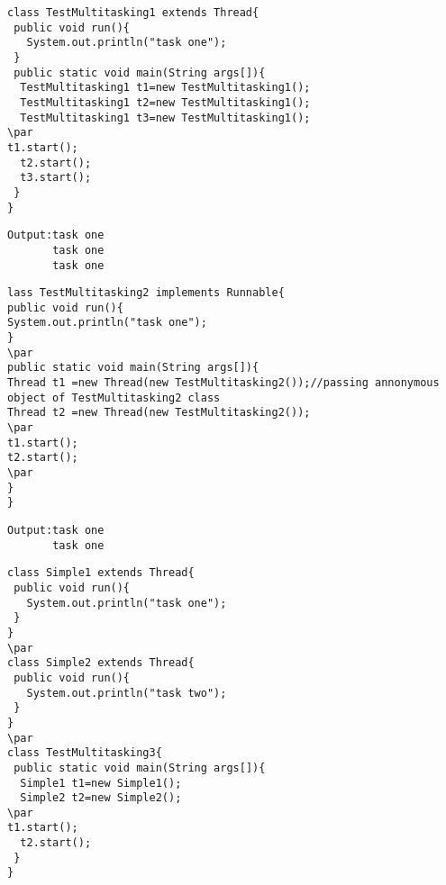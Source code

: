\documentclass{book}
\def\lthtmlcheckvsize{\ifdim\ht\sizebox<\vsize 
  \ifdim\wd\sizebox<\hsize\expandafter\hfill\fi \expandafter\vfill
  \else\expandafter\vss\fi}%
\begin{document}
{\newpage\clearpage
{}%
\begin{lstlisting}
class TestMultitasking1 extends Thread{  
 public void run(){  
   System.out.println("task one");  
 }  
 public static void main(String args[]){  
  TestMultitasking1 t1=new TestMultitasking1();  
  TestMultitasking1 t2=new TestMultitasking1();  
  TestMultitasking1 t3=new TestMultitasking1();  
\par
t1.start();  
  t2.start();  
  t3.start();  
 }  
}  
\end{lstlisting}%
\lthtmlfigureZ
\lthtmlcheckvsize\clearpage}

{\newpage\clearpage
{}%
\begin{lstlisting}
Output:task one
       task one
       task one
\end{lstlisting}%
\lthtmlfigureZ
\lthtmlcheckvsize\clearpage}

{\newpage\clearpage
{}%
\begin{lstlisting}
lass TestMultitasking2 implements Runnable{  
public void run(){  
System.out.println("task one");  
}  
\par
public static void main(String args[]){  
Thread t1 =new Thread(new TestMultitasking2());//passing annonymous object of TestMultitasking2 class  
Thread t2 =new Thread(new TestMultitasking2());  
\par
t1.start();  
t2.start();  
\par
}  
}  
\end{lstlisting}%
\lthtmlfigureZ
\lthtmlcheckvsize\clearpage}

{\newpage\clearpage
{}%
\begin{lstlisting} 
Output:task one
       task one
\end{lstlisting}%
\lthtmlfigureZ
\lthtmlcheckvsize\clearpage}

{\newpage\clearpage
{}%
\begin{lstlisting}
class Simple1 extends Thread{  
 public void run(){  
   System.out.println("task one");  
 }  
}  
\par
class Simple2 extends Thread{  
 public void run(){  
   System.out.println("task two");  
 }  
}  
\par
class TestMultitasking3{  
 public static void main(String args[]){  
  Simple1 t1=new Simple1();  
  Simple2 t2=new Simple2();  
\par
t1.start();  
  t2.start();  
 }  
}  
\end{lstlisting}%
\lthtmlfigureZ
\lthtmlcheckvsize\clearpage}
\end{document}
